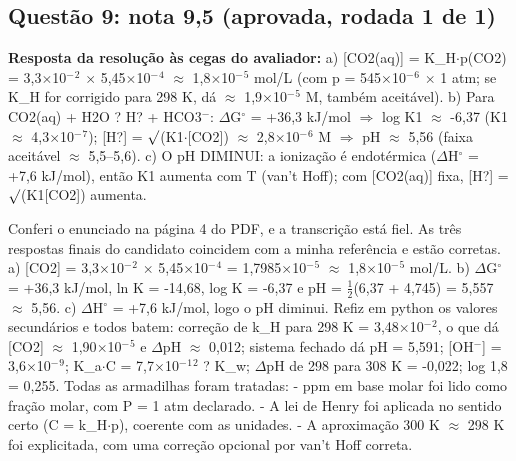 \documentclass{article}%
\begin{document}
\subsection*{Questão 9: nota 9,5 (aprovada, rodada 1 de 1)}%
\textbf{Resposta da resolução às cegas do avaliador:} a) {[}CO2(aq){]} = K\_H$\cdot$p(CO2) = 3,3$\times$10$^{-}$$^2$ $\times$ 5,45$\times$10$^{-}$$^{4}$ $\approx$ 1,8$\times$10$^{-}$$^{5}$ mol/L (com p = 545$\times$10$^{-}$$^{6}$ $\times$ 1 atm; se K\_H for corrigido para 298 K, dá $\approx$ 1,9$\times$10$^{-}$$^{5}$ M, também aceitável).\newline%
b) Para CO2(aq) + H2O ? H? + HCO3$^{-}$: $\Delta$G$^\circ$ = +36,3 kJ/mol $\Rightarrow$ log K1 $\approx$ -6,37 (K1 $\approx$ 4,3$\times$10$^{-}$$^{7}$); {[}H?{]} = $\surd$(K1$\cdot${[}CO2{]}) $\approx$ 2,8$\times$10$^{-}$$^{6}$ M $\Rightarrow$ pH $\approx$ 5,56 (faixa aceitável $\approx$ 5,5--5,6).\newline%
c) O pH DIMINUI: a ionização é endotérmica ($\Delta$H$^\circ$ = +7,6 kJ/mol), então K1 aumenta com T (van't Hoff); com {[}CO2(aq){]} fixa, {[}H?{]} = $\surd$(K1{[}CO2{]}) aumenta.\par %
Conferi o enunciado na página 4 do PDF, e a transcrição está fiel. As três respostas finais do candidato coincidem com a minha referência e estão corretas. a) {[}CO2{]} = 3,3$\times$10$^{-}$$^2$ $\times$ 5,45$\times$10$^{-}$$^{4}$ = 1,7985$\times$10$^{-}$$^{5}$ $\approx$ 1,8$\times$10$^{-}$$^{5}$ mol/L. b) $\Delta$G$^\circ$ = +36,3 kJ/mol, ln K = -14,68, log K = -6,37 e pH = $\frac12$(6,37 + 4,745) = 5,557 $\approx$ 5,56. c) $\Delta$H$^\circ$ = +7,6 kJ/mol, logo o pH diminui. Refiz em python os valores secundários e todos batem: correção de k\_H para 298 K = 3,48$\times$10$^{-}$$^2$, o que dá {[}CO2{]} $\approx$ 1,90$\times$10$^{-}$$^{5}$ e $\Delta$pH $\approx$ 0,012; sistema fechado dá pH = 5,591; {[}OH$^{-}${]} = 3,6$\times$10$^{-}$$^{9}$; K\_a$\cdot$C = 7,7$\times$10$^{-}$$^{1}$$^2$ ? K\_w; $\Delta$pH de 298 para 308 K = -0,022; log 1,8 = 0,255.\newline%
\newline%
Todas as armadilhas foram tratadas:\newline%
{-} ppm em base molar foi lido como fração molar, com P = 1 atm declarado.\newline%
{-} A lei de Henry foi aplicada no sentido certo (C = k\_H$\cdot$p), coerente com as unidades.\newline%
{-} A aproximação 300 K $\approx$ 298 K foi explicitada, com uma correção opcional por van't Hoff correta.\newline%
\end{document}
